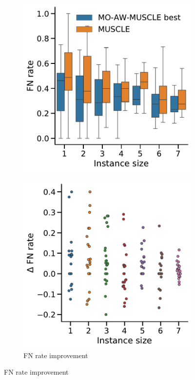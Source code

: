 \begin{figure}[!htbp]
\begin{adjustwidth}{-1.2cm}{}
		\begin{subfigure}{0.40\textwidth} \includegraphics[width=\textwidth]{Figure/comparison-momuscle} 
		\end{subfigure}
		\begin{subfigure}{0.40\textwidth} \includegraphics[width=\textwidth]{Figure/delta4-ml} \caption{ FN rate improvement}\label{fig:scatter-ml}\end{subfigure}

\end{adjustwidth}
\end{figure}
